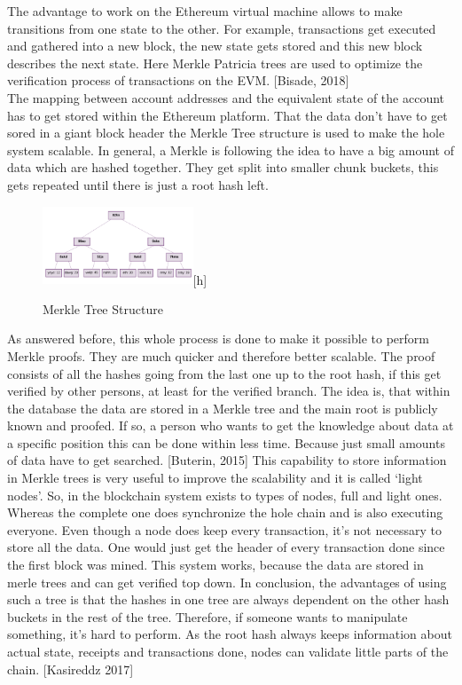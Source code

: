 The advantage to work on the Ethereum virtual machine allows to make transitions from one state to the other. For example, transactions get executed and gathered into a new block, the new state gets stored and this new block describes the next state. Here Merkle Patricia trees are used to optimize the verification process of transactions on the EVM. [Bisade, 2018]
\\
The mapping between account addresses and the equivalent state of the account has to get stored within the Ethereum platform. That the data don’t have to get sored in a giant block header the Merkle Tree structure is used to make the hole system scalable. In general, a Merkle is following the idea to have a big amount of data which are hashed together. They get split into smaller chunk buckets, this gets repeated until there is just a root hash left. \cite{Butin 2015}

\begin{figure}[ht]
\centering 
\caption{Merkle Tree Structure}
\includegraphics[width=0.4\textwidth]{MerkleTree1}[h]
\end{figure}

As answered before, this whole process is done to make it possible to perform Merkle proofs. They are much quicker and therefore better scalable. The proof consists of all the hashes going from the last one up to the root hash, if this get verified by other persons, at least for the verified branch. The idea is, that within the database the data are stored in a Merkle tree and the main root is publicly known and proofed. If so, a person who wants to get the knowledge about data at a specific position this can be done within less time. Because just small amounts of data have to get searched. [Buterin, 2015]
This capability to store information in Merkle trees is very useful to improve the scalability and it is called ‘light nodes’. So, in the blockchain system exists to types of nodes, full and light ones. Whereas the complete one does synchronize the hole chain and is also executing everyone. Even though a node does keep every transaction, it’s not necessary to store all the data. One would just get the header of every transaction done since the first block was mined. This system works, because the data are stored in merle trees and can get verified top down. In conclusion, the advantages of using such a tree is that the hashes in one tree are always dependent on the other hash buckets in the rest of the tree. Therefore, if someone wants to manipulate something, it’s hard to perform. As the root hash always keeps information about actual state, receipts and transactions done, nodes can validate little parts of the chain. [Kasireddz 2017]

